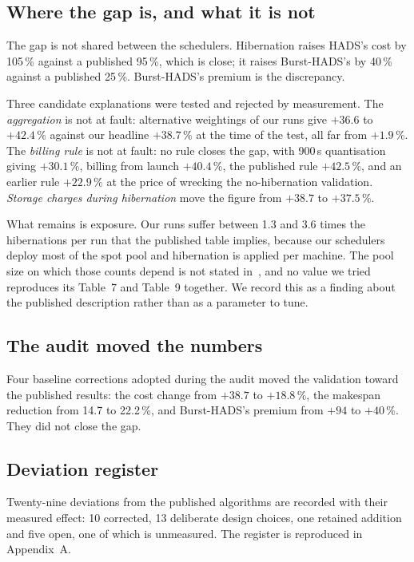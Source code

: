 \documentclass[conference]{IEEEtran}
\begin{document}
\subsection{Where the gap is, and what it is not}

The gap is not shared between the schedulers. Hibernation raises HADS's cost by
105\,\% against a published 95\,\%, which is close; it raises Burst-HADS's by
40\,\% against a published 25\,\%. Burst-HADS's premium is the discrepancy.

Three candidate explanations were tested and rejected by measurement. The
\emph{aggregation} is not at fault: alternative weightings of our runs give
$+36.6$ to $+42.4\,\%$ against our headline $+38.7\,\%$ at the time of the test,
all far from $+1.9\,\%$. The \emph{billing rule} is not at fault: no rule closes
the gap, with 900\,s quantisation giving $+30.1\,\%$, billing from launch
$+40.4\,\%$, the published rule $+42.5\,\%$, and an earlier rule $+22.9\,\%$ at
the price of wrecking the no-hibernation validation. \emph{Storage charges
during hibernation} move the figure from $+38.7$ to $+37.5\,\%$.

What remains is exposure. Our runs suffer between 1.3 and 3.6 times the
hibernations per run that the published table implies, because our schedulers
deploy most of the spot pool and hibernation is applied per machine. The pool
size on which those counts depend is not stated in~\cite{teylo2023}, and no
value we tried reproduces its Table~7 and Table~9 together. We record this as a
finding about the published description rather than as a parameter to tune.

\subsection{The audit moved the numbers}

Four baseline corrections adopted during the audit moved the validation toward
the published results: the cost change from $+38.7$ to $+18.8\,\%$, the makespan
reduction from 14.7 to 22.2\,\%, and Burst-HADS's premium from $+94$ to
$+40\,\%$. They did not close the gap.

\subsection{Deviation register}

Twenty-nine deviations from the published algorithms are recorded with their
measured effect: 10 corrected, 13 deliberate design choices, one retained
addition and five open, one of which is unmeasured. The register is reproduced
in Appendix~A.
\end{document}
